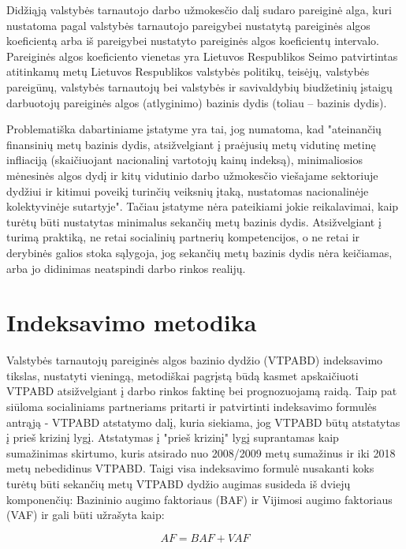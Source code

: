 \documentclass[titlepage, 11pt]{article}
\begin{document}
Didžiąją valstybės tarnautojo darbo užmokesčio dalį sudaro pareiginė alga, kuri nustatoma pagal valstybės tarnautojo pareigybei nustatytą pareiginės algos koeficientą arba iš pareigybei nustatyto pareiginės algos koeficientų intervalo. Pareiginės algos koeficiento vienetas yra Lietuvos Respublikos Seimo patvirtintas atitinkamų metų Lietuvos Respublikos valstybės politikų, teisėjų, valstybės pareigūnų, valstybės tarnautojų bei valstybės ir savivaldybių biudžetinių įstaigų darbuotojų pareiginės algos (atlyginimo) bazinis dydis (toliau – bazinis dydis). 

Problematiška dabartiniame įstatyme yra tai, jog numatoma, kad "ateinančių finansinių metų bazinis dydis, atsižvelgiant į praėjusių metų vidutinę metinę infliaciją (skaičiuojant nacionalinį vartotojų kainų indeksą), minimaliosios mėnesinės algos dydį ir kitų vidutinio darbo užmokesčio viešajame sektoriuje dydžiui ir kitimui poveikį turinčių veiksnių įtaką, nustatomas nacionalinėje kolektyvinėje sutartyje". Tačiau įstatyme nėra pateikiami jokie reikalavimai, kaip turėtų būti nustatytas minimalus sekančių metų bazinis dydis. Atsižvelgiant į turimą praktiką, ne retai socialinių partnerių kompetencijos, o ne retai ir derybinės galios stoka sąlygoja, jog sekančių metų bazinis dydis nėra keičiamas, arba jo didinimas neatspindi darbo rinkos realijų.


\section{Indeksavimo metodika}
Valstybės tarnautojų pareiginės algos bazinio dydžio (VTPABD) indeksavimo tikslas, nustatyti vieningą, metodiškai pagrįstą būdą kasmet apskaičiuoti VTPABD atsižvelgiant į darbo rinkos faktinę bei prognozuojamą raidą.
Taip pat siūloma socialiniams partneriams pritarti ir patvirtinti  indeksavimo formulės antrąją - VTPABD atstatymo dalį, kuria siekiama, jog VTPABD būtų atstatytas į prieš krizinį lygį. Atstatymas į "prieš krizinį" lygį suprantamas kaip sumažinimas skirtumo, kuris atsirado nuo 2008/2009 metų sumažinus ir iki 2018 metų nebedidinus VTPABD. 
Taigi visa indeksavimo formulė nusakanti koks turėtų būti sekančių metų VTPABD dydžio augimas susideda iš dviejų komponenčių: Bazininio augimo faktoriaus (BAF) ir Vijimosi augimo faktoriaus (VAF) ir gali būti užrašyta kaip:

\begin{equation}
AF=BAF+VAF
\end{equation}
\end{document}
